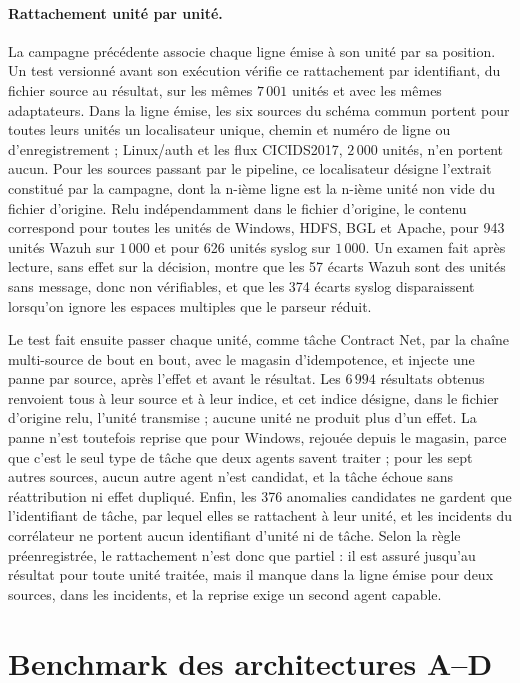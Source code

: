 \paragraph{Rattachement unité par unité.}\label{sec:r1-lineage} La campagne précédente associe chaque ligne émise à son unité par sa position. Un test versionné avant son exécution vérifie ce rattachement par identifiant, du fichier source au résultat, sur les mêmes $7\,001$ unités et avec les mêmes adaptateurs. Dans la ligne émise, les six sources du schéma commun portent pour toutes leurs unités un localisateur unique, chemin et numéro de ligne ou d'enregistrement ; Linux/auth et les flux CICIDS2017, $2\,000$ unités, n'en portent aucun. Pour les sources passant par le pipeline, ce localisateur désigne l'extrait constitué par la campagne, dont la n-ième ligne est la n-ième unité non vide du fichier d'origine. Relu indépendamment dans le fichier d'origine, le contenu correspond pour toutes les unités de Windows, HDFS, BGL et Apache, pour 943 unités Wazuh sur $1\,000$ et pour 626 unités syslog sur $1\,000$. Un examen fait après lecture, sans effet sur la décision, montre que les 57 écarts Wazuh sont des unités sans message, donc non vérifiables, et que les 374 écarts syslog disparaissent lorsqu'on ignore les espaces multiples que le parseur réduit.

Le test fait ensuite passer chaque unité, comme tâche Contract Net, par la chaîne multi-source de bout en bout, avec le magasin d'idempotence, et injecte une panne par source, après l'effet et avant le résultat. Les $6\,994$ résultats obtenus renvoient tous à leur source et à leur indice, et cet indice désigne, dans le fichier d'origine relu, l'unité transmise ; aucune unité ne produit plus d'un effet. La panne n'est toutefois reprise que pour Windows, rejouée depuis le magasin, parce que c'est le seul type de tâche que deux agents savent traiter ; pour les sept autres sources, aucun autre agent n'est candidat, et la tâche échoue sans réattribution ni effet dupliqué. Enfin, les 376 anomalies candidates ne gardent que l'identifiant de tâche, par lequel elles se rattachent à leur unité, et les incidents du corrélateur ne portent aucun identifiant d'unité ni de tâche. Selon la règle préenregistrée, le rattachement n'est donc que partiel : il est assuré jusqu'au résultat pour toute unité traitée, mais il manque dans la ligne émise pour deux sources, dans les incidents, et la reprise exige un second agent capable.

\section{Benchmark des architectures A--D}


